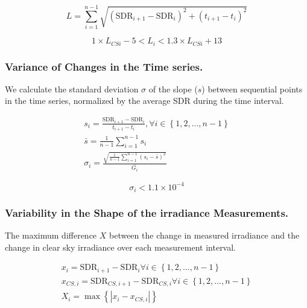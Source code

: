 \documentclass[
  preprint, 3p, authoryear]{article}
\begin{document}
\begin{equation}
L = \sum_{i=1}^{n-1}\sqrt{\left ( \text{SDR}_{i+1} - \text{SDR}_{i}\right )^2 + \left ( t_{i+1} - t_i \right )^2}
\label{eq:VILeq}
\end{equation}

\begin{equation}
1 \times L_{CSi} - 5 < L_i < 1.3 \times L_{CSi} + 13
\label{eq:VILcr}
\end{equation}

\hypertarget{variance-of-changes-in-the-time-series.}{%
\subsubsection{Variance of Changes in the Time series.}\label{variance-of-changes-in-the-time-series.}}

We calculate the standard deviation \(\sigma\) of the slope
(\(s\)) between sequential points in the time series, normalized by the average SDR during the time interval.

\begin{gather}
s_i = \frac{\text{SDR}_{i+1} - \text{SDR}_{i}}{t_{i+1} - t_i}, \forall i \in \left \{ 1, 2, \ldots, n-1 \right \} \label{eq:VCT1} \\
\bar{s} = \frac{1}{n-1} \sum_{i=1}^{n-1} s_i \label{eq:VCT2} \\
\sigma_i = \frac {\sqrt{\frac{1}{n-1} \sum_{i=1}^{n-1} \left( s_i - \bar{s} \right)^2} } {\bar{G_i}} \label{eq:VCT3}
\end{gather}

\begin{equation}
\sigma_i < \ensuremath{1.1\times 10^{-4}}
\label{eq:VCTcr}
\end{equation}

\hypertarget{variability-in-the-shape-of-the-irradiance-measurements.}{%
\subsubsection{Variability in the Shape of the irradiance Measurements.}\label{variability-in-the-shape-of-the-irradiance-measurements.}}

The maximum difference \(X\) between the change in measured irradiance and the change in clear sky
irradiance over each measurement interval.

\begin{gather}
x_i = \text{SDR}_{i+1} - \text{SDR}_{i} \forall i \in \left \{ 1, 2, \ldots, n-1 \right \} \label{eq:VSM1} \\
x_{CS,i} = \text{SDR}_{CS,i+1} - \text{SDR}_{CS,i} \forall i \in \left \{ 1, 2, \ldots, n-1 \right \} \label{eq:VSM2} \\
X_i = \max{\left \{ \left | x_i - x_{CS,i} \right | \right \}} \label{eq:VSM3}
\end{gather}
\end{document}
